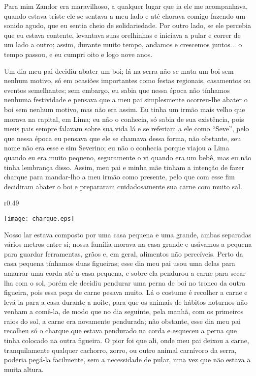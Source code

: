 Para mim Zandor era maravilhoso, a qualquer lugar que ia ele me acompanhava, quando estava triste ele se sentava a meu lado e até chorava comigo fazendo um sonido agudo, que eu sentia cheio de solidariedade. 
Por outro lado, se ele percebia que eu estava contente, levantava suas orelhinhas e iniciava a pular e correr de um lado a outro; assim, durante muito tempo, andamos e crescemos juntos... o tempo passou, e eu cumpri oito e logo nove anos.

Um dia meu pai decidiu abater um boi; lá na serra não se mata um boi sem nenhum motivo, só em ocasiões importantes como festas regionais, casamentos ou eventos semelhantes; sem embargo, eu sabia que nessa época não tínhamos nenhuma festividade e pensava que a meu pai simplesmente ocorreu-lhe abater o boi sem nenhum motivo, mas não era assim. 
Eu tinha um irmão mais velho que morava na capital, em Lima; eu não o conhecia, só sabia de sua existência, pois meus pais sempre falavam sobre sua vida lá e se referiam a ele como ``Seve'', pelo que nessa época eu pensava que ele se chamava dessa forma, não obstante, seu nome não era esse e sim Severino; eu não o conhecia porque viajou a Lima quando eu era muito pequeno, seguramente o vi quando era um bebê, mas eu não tinha lembrança disso. 
Assim, meu pai e minha mãe tinham a intenção de fazer charque para mandar-lho a meu irmão como presente, pelo que com esse fim decidiram abater o boi e prepararam cuidadosamente sua carne com muito sal.

\ifdefined\EnableIncludeImages
\begin{wrapfigure}{r}{0.49\textwidth}
  \begin{center}
  \vspace{-20pt}
    \texttt{[image: charque.eps]}
  \end{center}
  \vspace{-20pt}
\end{wrapfigure}
\fi
Nosso lar estava composto por uma casa pequena e uma grande, ambas separadas vários metros entre si; nossa família morava na casa grande e usávamos a pequena para guardar ferramentas, grãos e, em geral, alimentos não perecíveis. Perto da casa pequena tínhamos duas figueiras; esse dia meu pai usou uma delas para amarrar uma corda até a casa pequena, e sobre ela pendurou a carne para secar-lha com o sol, porém ele decidiu pendurar uma perna de boi no tronco da outra figueira, pois essa peça de carne pesava muito.
Lá o costume é recolher a carne e levá-la para a casa durante a noite, para que os animais de hábitos noturnos não venham a comê-la, de modo que no dia seguinte, pela manhã, com os primeiros raios do sol, a carne era novamente pendurada; não obstante, esse dia meu pai recolheu só o charque que estava pendurado na corda e esqueceu a perna que tinha colocado na outra figueira. 
O pior foi que ali, onde meu pai deixou a carne, tranquilamente qualquer cachorro, zorro, ou outro animal carnívoro da serra, poderia pegá-la facilmente, sem a necessidade de pular, uma vez que não estava a muita altura.

